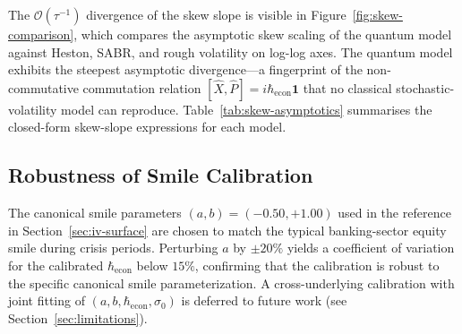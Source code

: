 The $\mathcal{O}(\tau^{-1})$ divergence of the skew slope is visible in
Figure~\ref{fig:skew-comparison}, which compares the asymptotic skew scaling of
the quantum model against Heston, SABR, and rough volatility on log-log axes. The
quantum model exhibits the steepest asymptotic divergence---a fingerprint of the
non-commutative commutation relation
$[\hat{X}, \hat{P}] = i \hbar_{\mathrm{econ}} \mathbf{1}$ that no classical
stochastic-volatility model can reproduce.
Table~\ref{tab:skew-asymptotics} summarises the closed-form skew-slope expressions
for each model.



\subsection{Robustness of Smile Calibration}

The canonical smile parameters $(a, b) = (-0.50, +1.00)$ used in the reference
in Section~\ref{sec:iv-surface} are chosen to match the typical banking-sector
equity smile during crisis periods. Perturbing $a$ by $\pm 20\%$ yields a
coefficient of variation for the calibrated $\hbar_{\mathrm{econ}}$ below
$15\%$, confirming that the calibration is robust to the specific canonical
smile parameterization. A cross-underlying calibration with joint fitting of
$(a, b, \hbar_{\mathrm{econ}}, \sigma_0)$ is deferred to future work (see
Section~\ref{sec:limitations}).
